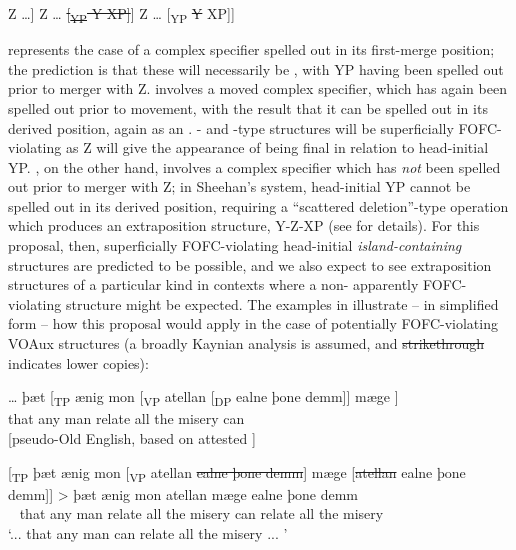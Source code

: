 \documentclass[output=paper]{LSP/langsci}
\begin{document}
\ea%
    \label{ex:biberauer:11} 
\ea \label{ex:biberauer:11a}\relax  [\textsubscript{ZP} [\textsubscript{YP} Y XP] Z …]  
\ex \label{ex:biberauer:11b}\relax   [\textsubscript{ZP} [\textsubscript{YP} Y XP] Z … \sout{[\textsubscript{YP} Y XP]}]
\ex \label{ex:biberauer:11c}\relax   [\textsubscript{ZP} [\textsubscript{YP} Y \st{XP}] Z … [\textsubscript{YP} \st{Y} XP]]
\z
\z

\largerpage[2]%
 represents the case of a complex specifier spelled out in its first-merge position; the prediction is that these will necessarily be , with YP having been spelled out prior to merger with Z.  involves a moved complex specifier, which has again been spelled out prior to movement, with the result that it can be spelled out in its derived position, again as an . - and -type structures will be superficially FOFC-violating as Z will give the appearance of being final in relation to head-initial YP. , on the other hand, involves a complex specifier which has \textit{not} been spelled out prior to merger with Z; in Sheehan’s system, head-initial YP cannot be spelled out in its derived position, requiring a “scattered deletion”-type operation which produces an extraposition structure, Y-Z-XP (see \citealt{Sheehan2013fofc} for details). For this proposal, then, superficially FOFC-violating head-initial \textit{island-containing} structures are predicted to be possible, and we also expect to see extraposition structures of a particular kind in contexts where a non- apparently FOFC-violating structure might be expected. The examples in  illustrate – in simplified form – how this proposal would apply in the case of potentially FOFC-violating VOAux structures (a broadly Kaynian analysis is assumed, and \sout{strikethrough} indicates lower copies):

\ea%
    \label{ex:biberauer:12}
  \ea   \label{ex:biberauer:12a}
  \gll *… þæt [\textsubscript{TP} ænig mon [\textsubscript{VP} atellan [\textsubscript{DP} ealne þone demm]] mæge ]\\
    {} that   {}    any  man    {}   relate    {}     all     the     misery   can\\

  {}[pseudo-Old English, based on attested ]

 \ex  \label{ex:biberauer:12b}
 \gll {}[\textsubscript{TP} þæt ænig mon [\textsubscript{VP} atellan \sout{ealne þone demm}] mæge [\st{atellan} ealne þone demm]]  > þæt ænig mon atellan mæge ealne þone demm \\
   ~  that  any   man   {}    relate   {all      the    misery} can      relate   all the misery\\
\glt  ‘... that any man can relate all the misery ... ’
\end{document}
